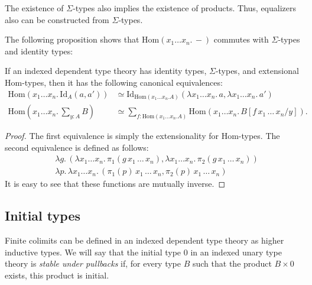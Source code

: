\documentclass[reqno]{mscs}
\newcommand{\fs}[1]{\mathrm{#1}}
\newcommand{\Hom}{\fs{Hom}}
\newcommand{\Id}{\fs{Id}}
\numberwithin{figure}{section}
\begin{document}
\begin{remark}
The existence of $\Sigma$-types also implies the existence of products.
Thus, equalizers also can be constructed from $\Sigma$-types.
\end{remark}

The following proposition shows that $\Hom(x_1 \ldots x_n.\,-)$ commutes with $\Sigma$-types and identity types:
\begin{prop}
If an indexed dependent type theory has identity types, $\Sigma$-types, and extensional $\Hom$-types, then it has the following canonical equivalences:
\begin{align*}
\Hom(x_1 \ldots x_n.\,\Id_A(a,a')) & \simeq \Id_{\Hom(x_1 \ldots x_n. A)}(\lambda x_1 \ldots x_n.\,a, \lambda x_1 \ldots x_n.\,a') \\
\Hom(x_1 \ldots x_n.\,\sum_{y : A} B) & \simeq \sum_{f : \Hom(x_1 \ldots x_n. A)} \Hom(x_1 \ldots x_n.\,B[f\,x_1\,\ldots\,x_n / y]).
\end{align*}
\end{prop}
\begin{proof}
The first equivalence is simply the extensionality for $\Hom$-types.
The second equivalence is defined as follows:
\begin{align*}
& \lambda g.\,(\lambda x_1 \ldots x_n.\,\pi_1(g\,x_1\,\ldots\,x_n), \lambda x_1 \ldots x_n.\,\pi_2(g\,x_1\,\ldots\,x_n)) \\
& \lambda p.\,\lambda x_1 \ldots x_n.\,(\pi_1(p)\,x_1\,\ldots\,x_n, \pi_2(p)\,x_1\,\ldots\,x_n)
\end{align*}
It is easy to see that these functions are mutually inverse.
\end{proof}

\subsection{Initial types}
\label{sec:dep-initial}

Finite colimits can be defined in an indexed dependent type theory as higher inductive types.
We will say that the initial type $0$ in an indexed unary type theory is \emph{stable under pullbacks} if, for every type $B$ such that the product $B \times 0$ exists, this product is initial.
\end{document}
